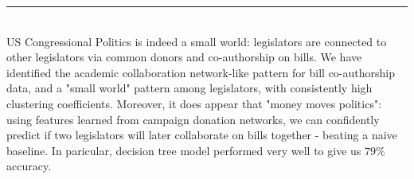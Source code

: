 \documentclass[a0]{a0poster}
\def\Head#1{\noindent{\LARGE\color{bluegray} #1}\bigskip}
\begin{document}
\begin{textblock}{7.0}
\medskip
\hrule \medskip
\Head{Conclusion}\\
US Congressional Politics is indeed a small world: legislators are connected to other legislators via common donors and co-authorship on bills. We have identified the academic collaboration network-like pattern for bill co-authorship data, and a "small world" pattern among legislators, with consistently high clustering coefficients. Moreover, it does appear that "money moves politics": using features learned from campaign donation networks, we can confidently predict if two legislators will later collaborate on bills together - beating a naive baseline. In paricular, decision tree model performed very well to give us $79\%$ accuracy. 

\end{textblock}
\end{document}

